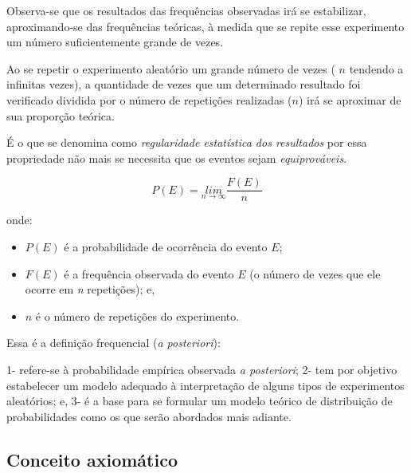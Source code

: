 \documentclass[
]{book}
\providecommand{\tightlist}{%
  \setlength{\itemsep}{0pt}\setlength{\parskip}{0pt}}
\begin{document}
\hfill\break

Observa-se que os resultados das frequências observadas irá se estabilizar, aproximando-se das frequências teóricas, à medida que se repite esse experimento um número suficientemente grande de vezes.

\hfill\break

Ao se repetir o experimento aleatório um grande número de vezes ( \(n\) tendendo a infinitas vezes), a quantidade de vezes que um determinado resultado foi verificado dividida por o número de repetições realizadas (\(n\)) irá se aproximar de sua proporção teórica.

\hfill\break

É o que se denomina como \emph{regularidade estatística dos resultados} por essa propriedade não mais se necessita que os eventos sejam \emph{equiprováveis}.

\hfill\break

\[
P\left(E\right)=\underset{n\to \infty }{lim}{\frac{F(E)}{n}}
\]

\hfill\break

onde:

\hfill\break

\begin{itemize}
\tightlist
\item
  \(P(E)\) é a probabilidade de ocorrência do evento \(E\);\\
\item
  \(F(E)\) é a frequência observada do evento \(E\) (o número de vezes que ele ocorre em \emph{n} repetições); e,\\
\item
  \(n\) é o número de repetições do experimento.
\end{itemize}

\hfill\break

Essa é a definição frequencial (\emph{a posteriori}):

\hfill\break

1- refere-se à probabilidade empírica observada \emph{a posteriori};
2- tem por objetivo estabelecer um modelo adequado à interpretação de alguns tipos de experimentos aleatórios; e,
3- é a base para se formular um modelo teórico de distribuição de probabilidades como os que serão abordados mais adiante.

\hfill\break

\hypertarget{conceito-axiomuxe1tico}{%
\subsection{Conceito axiomático}\label{conceito-axiomuxe1tico}}
\end{document}
